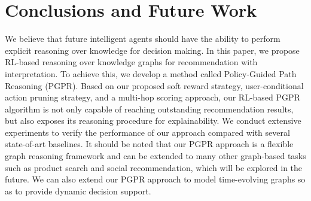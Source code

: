 \documentclass[sigconf]{acmart}
\begin{document}
\section{Conclusions and Future Work}
We believe that future intelligent agents should have the ability to perform explicit reasoning over knowledge for decision making. In this paper, we propose RL-based reasoning over knowledge graphs for recommendation with interpretation. To achieve this, we develop a method called Policy-Guided Path Reasoning (PGPR). Based on our proposed soft reward strategy, user-conditional action pruning strategy, and a multi-hop scoring approach, our RL-based PGPR algorithm is not only capable of reaching outstanding recommendation results, but also exposes its reasoning procedure for explainability. We conduct extensive experiments to verify the performance of our approach compared with several state-of-art baselines. 
It should be noted that our PGPR approach is a flexible graph reasoning framework and can be extended to many other graph-based tasks such as product search and social recommendation, which will be explored in the future. We can also extend our PGPR approach to model time-evolving graphs so as to provide dynamic decision support. 




\balance
\end{document}

